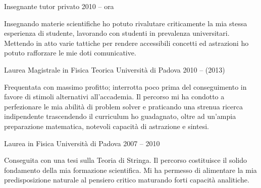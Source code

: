 \documentclass[9pt]{scrartcl}
\begin{document}
\Event
  {Insegnante}
  {tutor privato}
  {2010 -- ora}

Insegnando materie scientifiche ho potuto rivalutare criticamente la
mia stessa esperienza di studente, lavorando con studenti in prevalenza
universitari.  Mettendo in atto varie tattiche per rendere accessibili
concetti ed astrazioni ho potuto rafforzare le mie doti comunicative.




\Event
  {Laurea Magistrale in Fisica Teorica}
  {Università di Padova}
  {2010 -- (2013)}

Frequentata con massimo profitto; interrotta poco prima del conseguimento
in favore di stimoli alternativi all'accademia.
Il percorso mi ha condotto a perfezionare le mia abilità di problem solver e
praticando una strenua ricerca indipendente
trascendendo il curriculum ho guadagnato, oltre ad un'ampia
preparazione matematica, notevoli capacità di astrazione e sintesi.

\Event
  {Laurea in Fisica}
  {Università di Padova}
  {2007 -- 2010}

Conseguita con una tesi sulla Teoria di Stringa.
Il percorso costituisce il solido fondamento della mia formazione scientifica.
Mi ha permesso di alimentare la mia predisposizione naturale al pensiero critico
maturando forti capacità analitiche.
\end{document}
